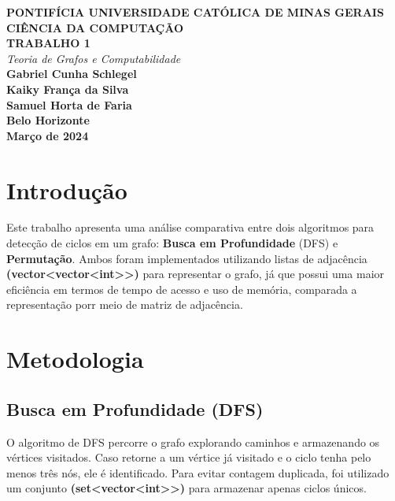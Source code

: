 \documentclass[a4paper,12pt]{article}
\begin{document}
\begin{titlepage}
    \centering
    \vspace*{2cm}
    \textbf{\large PONTIFÍCIA UNIVERSIDADE CATÓLICA DE MINAS GERAIS}\\
    
    \vspace*{0.5cm}
    \textbf{\large CIÊNCIA DA COMPUTAÇÃO}\\
    
    \vspace*{4cm}
    \textbf{\large TRABALHO 1}\\
    
    \vspace*{0.5cm}
    \textit{\large Teoria de Grafos e Computabilidade}\\
    
    \vfill
    \textbf{\large Gabriel Cunha Schlegel \\ Kaiky França da Silva \\ Samuel Horta de Faria}\\
    
    \vspace*{1.5cm}
    \textbf{\large Belo Horizonte}\\
    \vspace*{0.5cm}
    \textbf{\large Março de 2024}
\end{titlepage}

\tableofcontents
\newpage

\section{Introdução}

Este trabalho apresenta uma análise comparativa entre dois algoritmos para detecção de ciclos em um grafo: \textbf{Busca em Profundidade} (DFS) e \textbf{Permutação}. Ambos foram implementados utilizando listas de adjacência \textbf{(vector<vector<int>>)} para representar o grafo, já que possui uma maior eficiência em termos de tempo de acesso e uso de memória, comparada a representação porr meio de matriz de adjacência.  

\newpage

\section{Metodologia}

\subsection{Busca em Profundidade (DFS)}
O algoritmo de DFS percorre o grafo explorando caminhos e armazenando os vértices visitados. Caso retorne a um vértice já visitado e o ciclo tenha pelo menos três nós, ele é identificado. Para evitar contagem duplicada, foi utilizado um conjunto \textbf{(set<vector<int>>)} para armazenar apenas ciclos únicos.  
\end{document}
